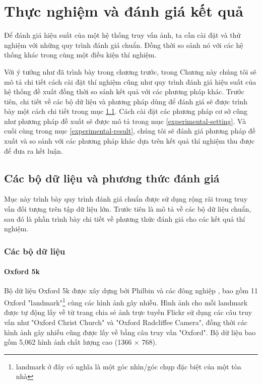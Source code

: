 \chapter{Thực nghiệm và đánh giá kết quả}
\label{chapter:experiment}
\ifpdf
    \graphicspath{{Chapter4/Chapter4Figs/PNG/}{Chapter4/Chapter4Figs/PDF/}{Chapter4/Chapter4Figs/}}
\else
    \graphicspath{{Chapter4/Chapter4Figs/EPS/}{Chapter4/Chapter4Figs/}}
\fi
{}

Để đánh giá hiệu suất của một hệ thống truy vấn ảnh, ta cần cài đặt và thử nghiệm với những quy trình đánh giá chuẩn. Đồng thời so sánh nó với các hệ thống khác trong cùng một điều kiện thí nghiệm.

Với ý tưởng như đã trình bày trong chương trước, trong Chương này chúng tôi sẽ mô tả chi tiết cách cài đặt thí nghiệm cũng như quy trình đánh giá hiệu suất của hệ thống đề xuất đồng thời so sánh kết quả với các phương pháp khác. Trước tiên, chi tiết về các bộ dữ liệu và phương pháp dùng để đánh giá sẽ được trình bày một cách chi tiết trong mục \ref{data-evaluate}. Cách cài đặt các phương pháp cơ sở cũng như phương pháp đề xuất sẽ được mô tả trong mục \ref{experimental-setting}. Và cuối cùng trong mục \ref{experimental-result}, chúng tôi sẽ đánh giá phương pháp đề xuất và so sánh với các phương pháp khác dựa trên kết quả thí nghiệm thu được để đưa ra kết luận.

\section{Các bộ dữ liệu và phương thức đánh giá}
\label{data-evaluate}
Mục này trình bày quy trình đánh giá chuẩn được sử dụng rộng rãi trong truy vấn đối tượng trên tập dữ liệu lớn. Trước tiên là mô tả về các bộ dữ liệu chuẩn, sau đó là phần trình bày chi tiết về phương thức đánh giá cho các kết quả thí nghiệm.

\subsection{Các bộ dữ liệu}

\subsubsection{Oxford 5k}
Bộ dữ liệu Oxford 5k được xây dựng bởi Philbin và các đông nghiệp \cite{philbin2007object}, bao gồm 11 Oxford "landmark"\footnote{landmark ở đây có nghĩa là một góc nhìn/góc chụp đặc biệt của một tòa nhà} cùng các hình ảnh gây nhiễu. Hình ảnh cho mỗi landmark được tự động lấy về từ trang chia sẻ ảnh trực tuyến Flickr sử dụng các câu truy vấn như "Oxford Christ Church" và "Oxford Radcliffee Camera", đồng thời các hình ảnh gây nhiễu cũng được lấy về bằng câu truy vấn "Oxford". Bộ dữ liệu bao gồm 5,062 hình ảnh chất lượng cao (1366 $\times$ 768).

